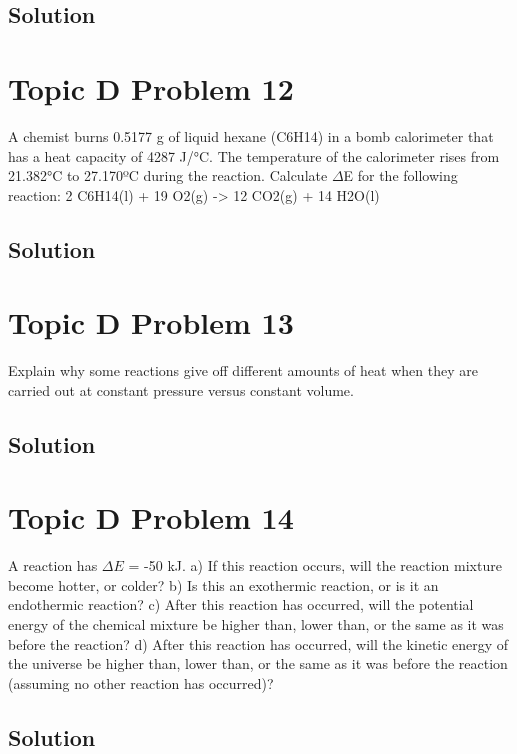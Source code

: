\documentclass[10pt]{article}
\begin{document}
        \subsection{Solution}

    \pagebreak
    \section{Topic D Problem 12}
        A chemist burns 0.5177 g of liquid hexane (C6H14) in a bomb calorimeter that has a heat
capacity of 4287 J/\unit{\celsius}. The temperature of the calorimeter rises from 21.382\unit{\celsius} to 27.170ºC
during the reaction. Calculate $\Delta$E for the following reaction:
2 C6H14(l) + 19 O2(g) -> 12 CO2(g) + 14 H2O(l)
        
        \subsection{Solution}

    \pagebreak
    \section{Topic D Problem 13}
        Explain why some reactions give off different amounts of heat when they are carried out at constant pressure versus constant volume.
        
        \subsection{Solution}

    \pagebreak
    \section{Topic D Problem 14}
        A reaction has $\Delta E$ = -50 kJ.
a) If this reaction occurs, will the reaction mixture become hotter, or colder?
b) Is this an exothermic reaction, or is it an endothermic reaction?
c) After this reaction has occurred, will the potential energy of the chemical mixture be
higher than, lower than, or the same as it was before the reaction?
d) After this reaction has occurred, will the kinetic energy of the universe be higher than,
lower than, or the same as it was before the reaction (assuming no other reaction has
occurred)?
        
        \subsection{Solution}
\end{document}
